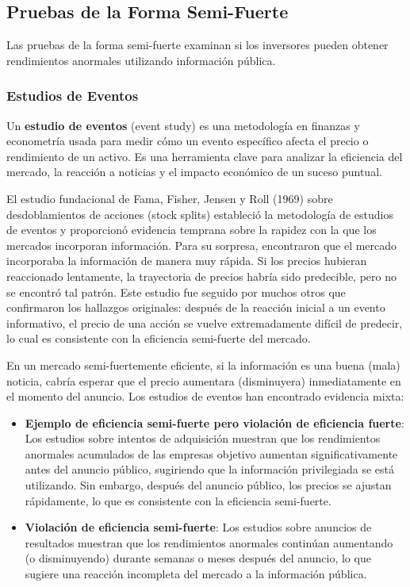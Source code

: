 \subsection{Pruebas de la Forma Semi-Fuerte}

Las pruebas de la forma semi-fuerte examinan si los inversores pueden obtener rendimientos anormales utilizando información pública.

\subsubsection{Estudios de Eventos}

\begin{definicion}
Un \textbf{estudio de eventos} (event study) es una metodología en finanzas y econometría usada para medir cómo un evento específico afecta el precio o rendimiento de un activo. Es una herramienta clave para analizar la eficiencia del mercado, la reacción a noticias y el impacto económico de un suceso puntual.
\end{definicion}

El estudio fundacional de Fama, Fisher, Jensen y Roll (1969) sobre desdoblamientos de acciones (stock splits) estableció la metodología de estudios de eventos y proporcionó evidencia temprana sobre la rapidez con la que los mercados incorporan información. Para su sorpresa, encontraron que el mercado incorporaba la información de manera muy rápida. Si los precios hubieran reaccionado lentamente, la trayectoria de precios habría sido predecible, pero no se encontró tal patrón. Este estudio fue seguido por muchos otros que confirmaron los hallazgos originales: después de la reacción inicial a un evento informativo, el precio de una acción se vuelve extremadamente difícil de predecir, lo cual es consistente con la eficiencia semi-fuerte del mercado.

En un mercado semi-fuertemente eficiente, si la información es una buena (mala) noticia, cabría esperar que el precio aumentara (disminuyera) inmediatamente en el momento del anuncio. Los estudios de eventos han encontrado evidencia mixta:

\begin{itemize}
\item \textbf{Ejemplo de eficiencia semi-fuerte pero violación de eficiencia fuerte}: Los estudios sobre intentos de adquisición muestran que los rendimientos anormales acumulados de las empresas objetivo aumentan significativamente antes del anuncio público, sugiriendo que la información privilegiada se está utilizando. Sin embargo, después del anuncio público, los precios se ajustan rápidamente, lo que es consistente con la eficiencia semi-fuerte.

\item \textbf{Violación de eficiencia semi-fuerte}: Los estudios sobre anuncios de resultados muestran que los rendimientos anormales continúan aumentando (o disminuyendo) durante semanas o meses después del anuncio, lo que sugiere una reacción incompleta del mercado a la información pública.
\end{itemize}


